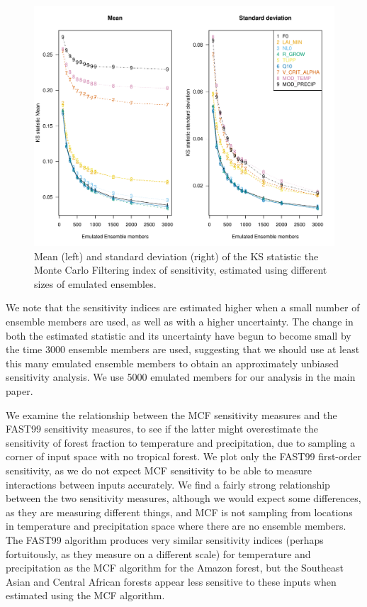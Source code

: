\documentclass[gmd, manuscript]{copernicus} %
\begin{document}
\begin{figure}[t]
\includegraphics[width=12cm]{../graphics/figS06.pdf}
\caption{ Mean (left) and standard deviation (right) of the KS statistic the Monte Carlo Filtering index of sensitivity, estimated using different sizes of emulated ensembles.}
\label{fig:mcf_mean_sd_vs_n}
\end{figure}

We note that the sensitivity indices are estimated higher when a small number of ensemble members are used, as well as with a higher uncertainty. The change in both the estimated statistic and its uncertainty have begun to become small by the time 3000 ensemble members are used, suggesting that we should use at least this many emulated ensemble members to obtain an approximately unbiased sensitivity analysis. We use 5000 emulated members for our analysis in the main paper.

We examine the relationship between the MCF sensitivity measures and the FAST99 sensitivity measures, to see if the latter might overestimate the sensitivity of forest fraction to temperature and precipitation, due to sampling a corner of input space with no tropical forest. We plot only the FAST99 first-order sensitivity, as we do not expect MCF sensitivity to be able to measure interactions between inputs accurately. We find a fairly strong relationship between the two sensitivity measures, although we would expect some differences, as they are measuring different things, and MCF is not sampling from locations in temperature and precipitation space where there are no ensemble members. The FAST99 algorithm produces very similar sensitivity indices (perhaps fortuitously, as they measure on a different scale) for temperature and precipitation as the MCF algorithm for the Amazon forest, but the Southeast Asian and Central African forests appear less sensitive to these inputs when estimated using the MCF algorithm.
\end{document}
